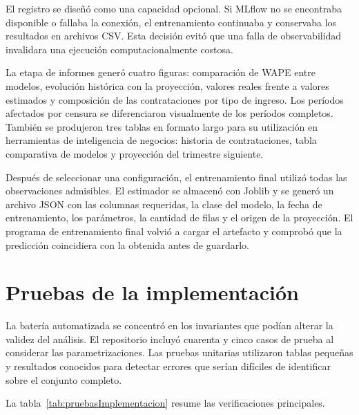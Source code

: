 El registro se diseñó como una capacidad opcional. Si MLflow no se encontraba disponible o fallaba la conexión, el entrenamiento continuaba y conservaba los resultados en archivos CSV. Esta decisión evitó que una falla de observabilidad invalidara una ejecución computacionalmente costosa.

La etapa de informes generó cuatro figuras: comparación de WAPE entre modelos, evolución histórica con la proyección, valores reales frente a valores estimados y composición de las contrataciones por tipo de ingreso. Los períodos afectados por censura se diferenciaron visualmente de los períodos completos. También se produjeron tres tablas en formato largo para su utilización en herramientas de inteligencia de negocios: historia de contrataciones, tabla comparativa de modelos y proyección del trimestre siguiente.

Después de seleccionar una configuración, el entrenamiento final utilizó todas las observaciones admisibles. El estimador se almacenó con Joblib y se generó un archivo JSON con las columnas requeridas, la clase del modelo, la fecha de entrenamiento, los parámetros, la cantidad de filas y el origen de la proyección. El programa de entrenamiento final volvió a cargar el artefacto y comprobó que la predicción coincidiera con la obtenida antes de guardarlo.

\section{Pruebas de la implementación}
\label{sec:pruebasImplementacion}

La batería automatizada se concentró en los invariantes que podían alterar la validez del análisis. El repositorio incluyó cuarenta y cinco casos de prueba al considerar las parametrizaciones. Las pruebas unitarias utilizaron tablas pequeñas y resultados conocidos para detectar errores que serían difíciles de identificar sobre el conjunto completo.

La tabla~\ref{tab:pruebasImplementacion} resume las verificaciones principales.

